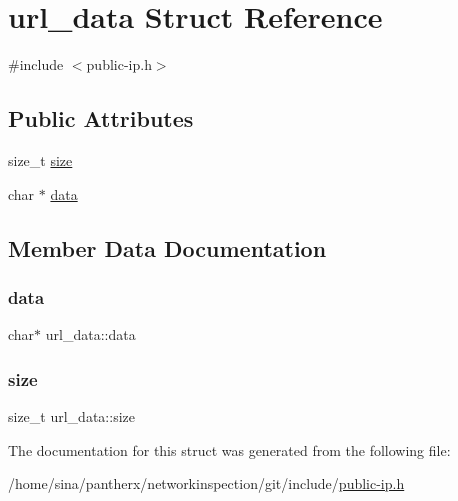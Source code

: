 \hypertarget{structurl__data}{}\section{url\+\_\+data Struct Reference}
\label{structurl__data}


{\ttfamily \#include $<$public-\/ip.\+h$>$}

\subsection*{Public Attributes}
\begin{DoxyCompactItemize}
\item 
size\+\_\+t \hyperlink{structurl__data_a580f76d1bdde5b56bb7454e89a0d1ba8}{size}
\item 
char $\ast$ \hyperlink{structurl__data_ad3a5fe9c035fd8d6821363df1ce77725}{data}
\end{DoxyCompactItemize}


\subsection{Member Data Documentation}
\mbox{\label{structurl__data_ad3a5fe9c035fd8d6821363df1ce77725}} 
\subsubsection{\texorpdfstring{data}{data}}
{\footnotesize\ttfamily char$\ast$ url\+\_\+data\+::data}

\mbox{\label{structurl__data_a580f76d1bdde5b56bb7454e89a0d1ba8}} 
\subsubsection{\texorpdfstring{size}{size}}
{\footnotesize\ttfamily size\+\_\+t url\+\_\+data\+::size}



The documentation for this struct was generated from the following file\+:\begin{DoxyCompactItemize}
\item 
/home/sina/pantherx/networkinspection/git/include/\hyperlink{public-ip_8h}{public-\/ip.\+h}\end{DoxyCompactItemize}
